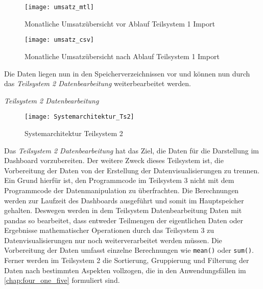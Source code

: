     \begin{figure}[H]
        \centering
            \texttt{[image: umsatz\_mtl]}
            \caption{Monatliche Umsatzübersicht vor Ablauf Teilsystem 1 Import}
            \label{fig:umsatzuebersicht_txt}
    \end{figure}


    \begin{figure}[H]
        \centering
            \texttt{[image: umsatz\_csv]}
            \caption{Monatliche Umsatzübersicht nach Ablauf Teilsystem 1 Import}
            \label{fig:umsatzuebersicht_csv}
    \end{figure}

    Die Daten liegen nun in den Speicherverzeichnissen vor und können nun durch das \textit{Teilsystem 2 Datenbearbeitung} 
    weiterbearbeitet werden.
    
    \noindent
    \textit{Teilsystem 2 Datenbearbeitung}

    \begin{figure}[H]
        \centering
            \texttt{[image: Systemarchitektur\_Ts2]}
            \caption{Systemarchitektur Teilsystem 2}
            \label{fig:Systemarchitektur Teilsystem 2}
    \end{figure}

    Das \textit{Teilsystem 2 Datenbearbeitung} hat das Ziel, die Daten für die Darstellung im Dashboard vorzubereiten. Der weitere Zweck dieses
    Teilsystem ist, die Vorbereitung der Daten von der Erstellung der Datenvisualisierungen zu trennen. Ein Grund hierfür
    ist, den Programmcode im Teilsystem 3 nicht mit dem Programmcode der Datenmanipulation zu überfrachten. Die  Berechnungen
    werden zur Laufzeit des Dashboards ausgeführt und somit im Hauptspeicher gehalten.
    Deswegen werden in dem Teilsystem Datenbearbeitung Daten mit pandas so bearbeitet, 
    dass entweder Teilmengen der eigentlichen Daten oder Ergebnisse mathematischer Operationen durch das Teilsystem 3 
    zu Datenvisualisierungen nur noch weiterverarbeitet werden müssen. Die Vorbereitung der Daten umfasst einzelne Berechnungen 
    wie \texttt{mean()} oder \texttt{sum()}. Ferner werden im Teilsystem 2 die Sortierung, Gruppierung und Filterung der 
    Daten nach bestimmten Aspekten vollzogen, die in den Anwendungsfällen im \autoref{chap:four_one_five} formuliert sind.
    
